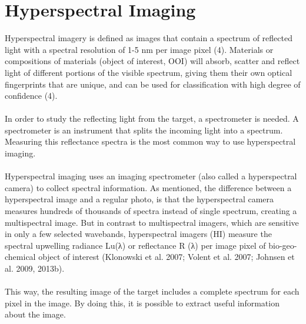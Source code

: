 \vspace{1.3cm}
\section{Hyperspectral Imaging}
Hyperspectral imagery is defined as images that contain a spectrum of reflected light with a spectral resolution of 1-5 nm per image pixel (4). Materials or compositions of materials (object of interest, OOI) will absorb, scatter and reflect light of different portions of the visible spectrum, giving them their own optical fingerprints that are unique, and can be used for classification with high degree of confidence (4). 
\\\\
In order to study the reflecting light from the target, a spectrometer is needed. A spectrometer is an instrument that splits the incoming light into a spectrum. Measuring this reflectance spectra is the most common way to use hyperspectral imaging.
\\\\
Hyperspectral imaging uses an imaging spectrometer (also called a hyperspectral camera) to collect spectral information. As mentioned, the difference between a hyperspectral image and a regular photo, is that the hyperspectral camera measures hundreds of thousands of spectra instead of single spectrum, creating a multispectral image. But in contrast to multispectral imagers, which are sensitive in only a few selected wavebands, hyperspectral imagers (HI) measure the spectral upwelling radiance Lu(λ) or reflectance R (λ) per image pixel of bio-geo-chemical object of interest (Klonowski et al. 2007; Volent et al. 2007; Johnsen et al. 2009, 2013b). %
\\\\
This way, the resulting image of the target includes a complete spectrum for each pixel in the image. By doing this, it is possible to extract useful information about the image.
\\\\


